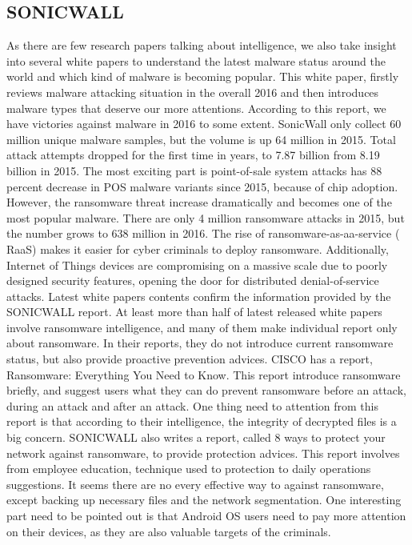 \documentclass[11pt]{article}
\begin{document}
	\subsection{SONICWALL}
	As there are few research papers talking about intelligence, we also take insight into several white papers to understand the latest malware status around the world and which kind of malware is becoming popular.
	This white paper, firstly reviews malware attacking situation in the overall 2016 and then introduces malware types that deserve our more attentions. According to this report, we have victories against malware in 2016 to some extent. SonicWall only collect 60 million unique malware samples, but the volume is up 64 million in 2015. Total attack attempts dropped for the first time in years, to 7.87 billion from 8.19 billion in 2015. The most exciting part is point-of-sale system attacks has 88 percent decrease in POS malware variants since 2015, because of chip adoption. However, the ransomware threat increase dramatically and becomes one of the most popular malware. There are only 4 million ransomware attacks in 2015, but the number grows to 638 million in 2016. The rise of ransomware-as-aa-service ( RaaS) makes it easier for cyber criminals to deploy ransomware. Additionally, Internet of Things devices are compromising on a massive scale due to poorly designed security features, opening the door for distributed denial-of-service attacks.
	Latest white papers contents confirm the information provided by the SONICWALL report. At least more than half of latest released white papers involve ransomware intelligence, and many of them make individual report only about ransomware.  In their reports, they do not introduce current ransomware status, but also provide proactive prevention advices. CISCO has a report, Ransomware: Everything You Need to Know. This report introduce ransomware briefly, and suggest users what they can do prevent ransomware before an attack, during an attack and after an attack. One thing need to attention from this report is that according to their intelligence, the integrity of decrypted files is a big concern. SONICWALL also writes a report, called 8 ways to protect your network against ransomware, to provide protection advices. This report involves from employee education, technique used to protection to daily operations suggestions. It seems there are no every effective way to against ransomware, except backing up necessary files and the network segmentation. One interesting part need to be pointed out is that Android OS users need to pay more attention on their devices, as they are also valuable targets of the criminals.
\end{document}
